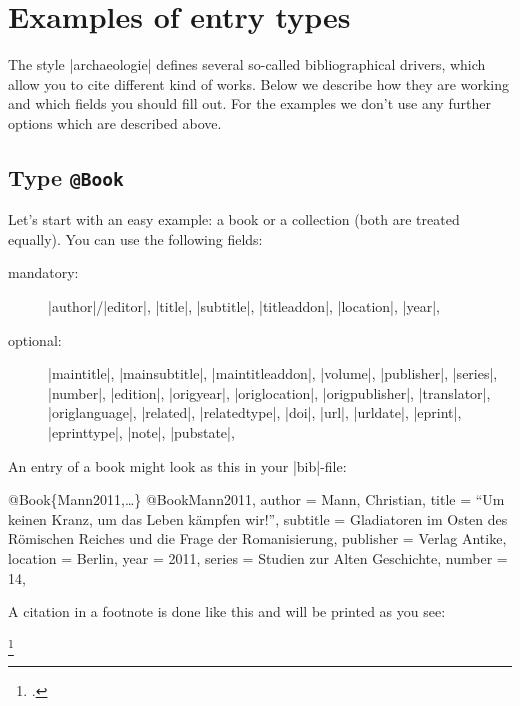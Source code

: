 \documentclass[a4paper,
10pt,
greek,
french,
spanish,
italian,
ngerman,
english,
]{ltxdoc}
\begin{document}
\section{Examples of entry types}\label{beispiele}
The style |archaeologie| defines several so-called bibliographical drivers,
which allow you to cite different kind of works.
Below we describe how they are working and which fields you should fill out.
For the examples we don't use any further options which are described above.

\subsection{Type \texttt{@Book}}\label{book}
Let’s start with an easy example: 
a book or a collection (both are treated equally).
You can use the following fields:
\begin{description}
\item[mandatory:] 
|author|/|editor|, 
|title|, |subtitle|, |titleaddon|,
|location|, |year|,
\item[optional:]
|maintitle|, |mainsubtitle|, |maintitleaddon|, |volume|, 
|publisher|, |series|, |number|, |edition|, 
|origyear|, |origlocation|, |origpublisher|, 
|translator|, |origlanguage|,
|related|, |relatedtype|,
|doi|, |url|, |urldate|, |eprint|, |eprinttype|, |note|, |pubstate|, 
 \end{description}
 
 
An entry of a book might look as this in your |bib|-file:
\begin{bibexample}[label=Mann2011]{{@}Book\{Mann2011,…\}}
@Book{Mann2011,
  author    = {Mann, Christian},
  title     = {\enquote{Um keinen Kranz, um das Leben kämpfen wir!}},
  subtitle  = {Gladiatoren im Osten des Römischen Reiches und die Frage der Romanisierung},
  publisher = {Verlag Antike},
  location  = Berlin,   %
  year      = {2011},
  series    = {Studien zur Alten Geschichte},
  number    = {14},
}
\end{bibexample}

A citation in a footnote is done like this and will be printed as you see:
\begin{example}
\footnote{\cite[Vgl.][142--144]{Mann2011}.}
\end{example} 
\end{document}
